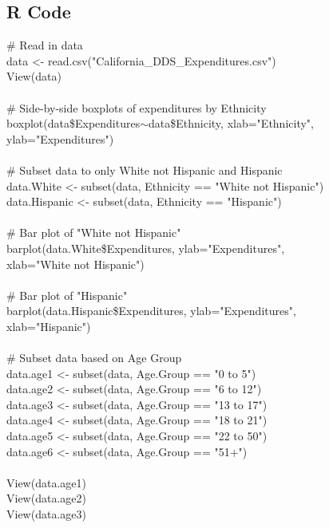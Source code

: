 \documentclass[12pt,letterpaper]{article}
\newcommand{\mycourier}[1]{{\fontfamily{pcr}\selectfont #1}}
\begin{document}
	\subsection{R Code}
	\setlength{\parindent}{3em}
	\singlespacing
	\mycourier{
		\# Read in data\\
		data <- read.csv("California\_DDS\_Expenditures.csv")\\
		View(data)\\
		\ \\
		\# Side-by-side boxplots of expenditures by Ethnicity\\
		boxplot(data\$Expenditures$\sim$data\$Ethnicity, xlab="Ethnicity",\\
		\indent ylab="Expenditures")\\
		\ \\
		\# Subset data to only White not Hispanic and Hispanic\\
		data.White <- subset(data, Ethnicity == "White not Hispanic")\\
		data.Hispanic <- subset(data, Ethnicity == "Hispanic")\\
		\ \\
		\# Bar plot of "White not Hispanic"\\
		barplot(data.White\$Expenditures, ylab="Expenditures",\\
		\indent xlab="White not Hispanic")\\
		\ \\
		\# Bar plot of "Hispanic"\\
		barplot(data.Hispanic\$Expenditures, ylab="Expenditures",\\
		\indent xlab="Hispanic")\\
		\ \\
		\# Subset data based on Age Group\\
		data.age1 <- subset(data, Age.Group == "0 to 5")\\
		data.age2 <- subset(data, Age.Group == "6 to 12")\\
		data.age3 <- subset(data, Age.Group == "13 to 17")\\
		data.age4 <- subset(data, Age.Group == "18 to 21")\\
		data.age5 <- subset(data, Age.Group == "22 to 50")\\
		data.age6 <- subset(data, Age.Group == "51+")\\
		\ \\
		View(data.age1)\\
		View(data.age2)\\
		View(data.age3)\\
}
\end{document}
